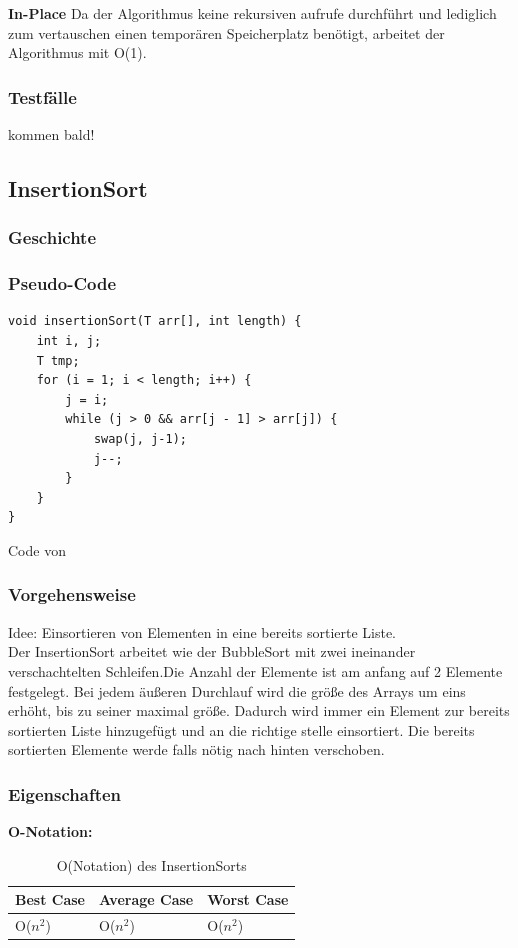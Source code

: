 \documentclass{article}
\begin{document}
\textbf{In-Place} Da der Algorithmus keine rekursiven aufrufe durchführt und lediglich zum vertauschen einen temporären Speicherplatz benötigt, arbeitet der Algorithmus mit O(1). \\




\subsubsection{Testfälle}
kommen bald!

\subsection{InsertionSort}
\subsubsection{Geschichte}
\subsubsection{Pseudo-Code}
\begin{lstlisting}
void insertionSort(T arr[], int length) {
    int i, j;
    T tmp;
    for (i = 1; i < length; i++) {
        j = i;
        while (j > 0 && arr[j - 1] > arr[j]) {
            swap(j, j-1);
            j--;
        }
    }
}
\end{lstlisting}
Code von \cite{InsertionSortCode}

\subsubsection{Vorgehensweise}
Idee: Einsortieren von Elementen in eine bereits sortierte Liste. \\

Der InsertionSort arbeitet wie der BubbleSort mit zwei ineinander verschachtelten Schleifen.Die Anzahl der Elemente ist am anfang auf 2 Elemente festgelegt. Bei jedem äußeren Durchlauf wird die größe des Arrays um eins erhöht, bis zu seiner maximal größe. Dadurch wird immer ein Element zur bereits sortierten Liste hinzugefügt und an die richtige stelle einsortiert. Die bereits sortierten Elemente werde falls nötig nach hinten verschoben.

\subsubsection{Eigenschaften}
\textbf{O-Notation:}
\begin{table}
\centering
\begin{tabular}{lll}
	\hline
	\textbf{Best Case} & \textbf{Average Case} & \textbf{Worst Case} \\
	\hline
	O($n^{2}$) & O($n^{2}$) & O($n^{2}$) \\
	\hline
\end{tabular}
\caption{O(Notation) des InsertionSorts}
\label{tab:InsertioneSort}
\end{table}
\end{document}

